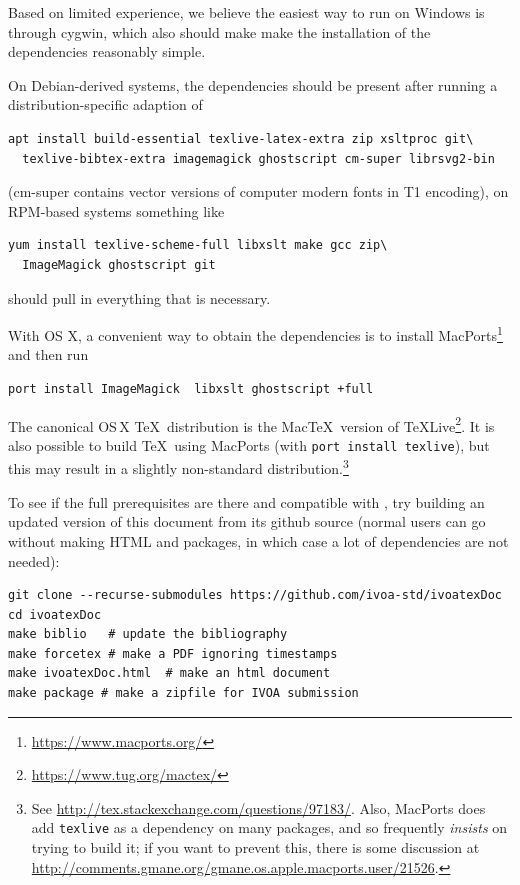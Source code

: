 \documentclass[11pt,a4paper]{ivoa}
\begin{document}
Based on limited experience, we believe the easiest way to run
\ivoatex{} on Windows is through cygwin, which also should make make the
installation of the dependencies reasonably simple.

On
Debian-derived systems, the dependencies should be present after
running a distribution-specific adaption of
\begin{lstlisting}[basicstyle=\footnotesize]
apt install build-essential texlive-latex-extra zip xsltproc git\
  texlive-bibtex-extra imagemagick ghostscript cm-super librsvg2-bin
\end{lstlisting}
(cm-super contains vector versions of computer modern fonts in T1
encoding), on RPM-based systems something like
\begin{lstlisting}
yum install texlive-scheme-full libxslt make gcc zip\
  ImageMagick ghostscript git
\end{lstlisting}
should pull in everything that is necessary.

With OS X, a convenient way to obtain the dependencies is to install
MacPorts\footnote{\url{https://www.macports.org/}} and then run
\begin{lstlisting}
port install ImageMagick  libxslt ghostscript +full
\end{lstlisting}
The canonical OS\,X \TeX\ distribution is the Mac\TeX\ version of
\TeX Live\footnote{\url{https://www.tug.org/mactex/}}.  It is also
possible to build \TeX\ using MacPorts (with \texttt{port install
  texlive}), but this may result in a slightly non-standard
distribution.\footnote{See
  \url{http://tex.stackexchange.com/questions/97183/}.
  Also, MacPorts does add
  \texttt{texlive} as a dependency on many packages, and so frequently
  \emph{insists} on trying to build it; if you want to prevent this,
  there is some discussion at
  \url{http://comments.gmane.org/gmane.os.apple.macports.user/21526}.}

To see if the full prerequisites are there and compatible with \ivoatex, try
building an updated version of this document from its github source
(normal users can go without making HTML and packages, in which case a
lot of dependencies are not needed):
\begin{lstlisting}[basicstyle=\footnotesize]
git clone --recurse-submodules https://github.com/ivoa-std/ivoatexDoc
cd ivoatexDoc
make biblio   # update the bibliography
make forcetex # make a PDF ignoring timestamps
make ivoatexDoc.html  # make an html document
make package # make a zipfile for IVOA submission
\end{lstlisting}
\end{document}

